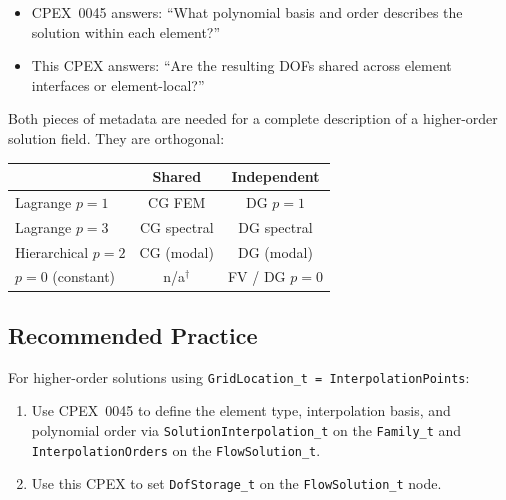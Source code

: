 \documentclass[11pt,letterpaper]{article}
\begin{document}
\begin{itemize}[leftmargin=2em]
\item CPEX~0045 answers: ``What polynomial basis and order describes
  the solution within each element?''
\item This CPEX answers: ``Are the resulting DOFs shared across element
  interfaces or element-local?''
\end{itemize}

Both pieces of metadata are needed for a complete description of a
higher-order solution field.  They are orthogonal:

\begin{center}
\begin{tabular}{lcc}
\toprule
& \textbf{Shared} & \textbf{Independent} \\
\midrule
Lagrange $p=1$ & CG FEM & DG $p=1$ \\
Lagrange $p=3$ & CG spectral & DG spectral \\
Hierarchical $p=2$ & CG (modal) & DG (modal) \\
$p=0$ (constant) & n/a$^{\dagger}$ & FV / DG $p=0$ \\
\bottomrule
\end{tabular}
\end{center}


\subsection{Recommended Practice}

For higher-order solutions using \texttt{GridLocation\_t =
InterpolationPoints}:

\begin{enumerate}[leftmargin=2em]
\item Use CPEX~0045 to define the element type, interpolation basis,
  and polynomial order via \texttt{SolutionInterpolation\_t} on the
  \texttt{Family\_t} and \texttt{InterpolationOrders} on the
  \texttt{FlowSolution\_t}.
\item Use this CPEX to set \texttt{DofStorage\_t} on the
  \texttt{FlowSolution\_t} node.
\end{enumerate}
\end{document}
